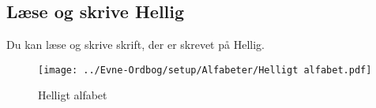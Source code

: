 \subsection*{Læse og skrive Hellig}
Du kan læse og skrive skrift, der er skrevet på Hellig.\\
\begin{figure}[H]
    \centering
    \texttt{[image: ../Evne-Ordbog/setup/Alfabeter/Helligt alfabet.pdf]}
    \caption{Helligt alfabet}
\end{figure}
